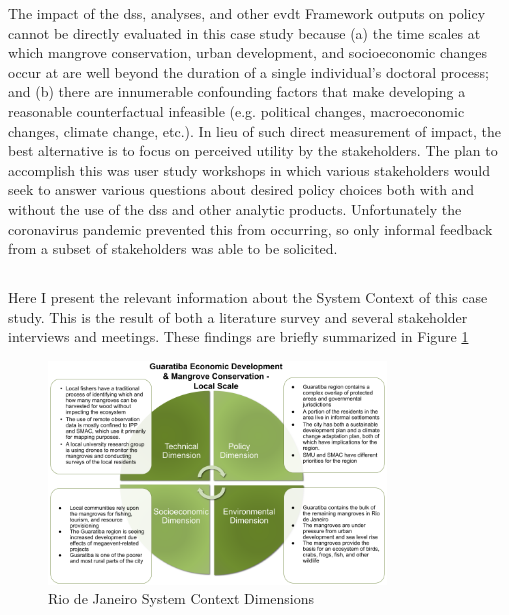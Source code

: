 The impact of the \ac{dss}, analyses, and other \ac{evdt} Framework outputs on policy cannot be directly evaluated in this case study because (a) the time scales at which mangrove conservation, urban development, and socioeconomic changes occur at are well beyond the duration of a single individual's doctoral process; and (b) there are innumerable confounding factors that make developing a reasonable counterfactual infeasible (e.g. political changes, macroeconomic changes, climate change, etc.). In lieu of such direct measurement of impact, the best alternative is to focus on perceived utility by the stakeholders. The plan to accomplish this was user study workshops in which various stakeholders would seek to answer various questions about desired policy choices both with and without the use of the \ac{dss} and other analytic products. Unfortunately the coronavirus pandemic prevented this from occurring, so only informal feedback from a subset of stakeholders was able to be solicited.


\subsection{} \label{sec:rio-saf-results}

\subsubsection{}

Here I present the relevant information about the System Context of this case study. This is the result of both a literature survey and several stakeholder interviews and meetings. These findings are briefly summarized in Figure \ref{fig:dimensions_rio}

\begin{figure}[H] 
\centering
\includegraphics[width=0.8\textwidth]{Figures/chap4/dimensions_rio.png}
\caption[Rio de Janeiro System Context Dimensions]{Rio de Janeiro System Context Dimensions}
\label{fig:dimensions_rio}
\end{figure}

